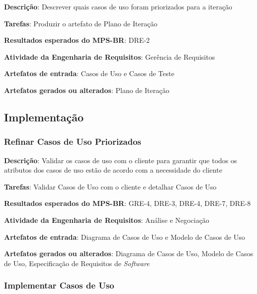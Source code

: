 \begin{description}
\item\textbf{Descrição}: Descrever quais casos de uso foram priorizados para a iteração
\item\textbf{Tarefas}: Produzir o artefato de Plano de Iteração
\item\textbf{Resultados esperados do MPS-BR}: DRE-2
\item\textbf{Atividade da Engenharia de Requisitos}: Gerência de Requisitos
\item\textbf{Artefatos de entrada}: Casos de Uso e Casos de Teste
\item\textbf{Artefatos gerados ou alterados}: Plano de Iteração
\end{description}

\subsection{Implementação}

\subsubsection{Refinar Casos de Uso Priorizados}


\begin{description}
\item\textbf{Descrição}: Validar os casos de uso com o cliente para garantir que todos os atributos dos casos de uso estão de acordo com a necessidade do cliente
\item\textbf{Tarefas}: Validar Casos de Uso com o cliente e detalhar Casos de Uso
\item\textbf{Resultados esperados do MPS-BR}: GRE-4, DRE-3, DRE-4, DRE-7, DRE-8
\item\textbf{Atividade da Engenharia de Requisitos}: Análise e Negociação
\item\textbf{Artefatos de entrada}: Diagrama de Casos de Uso e Modelo de Casos de Uso
\item\textbf{Artefatos gerados ou alterados}: Diagrama de Casos de Uso, Modelo de Casos de Uso, Especificação de Requisitos de \textit{Software}
\end{description}

\subsubsection{Implementar Casos de Uso}

